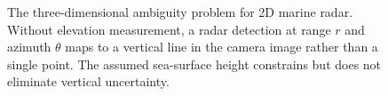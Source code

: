 \begin{figure}[t]
\caption{The three-dimensional ambiguity problem for 2D marine radar. Without elevation measurement, a radar detection at range $r$ and azimuth $\theta$ maps to a vertical line in the camera image rather than a single point. The assumed sea-surface height constrains but does not eliminate vertical uncertainty.}
\label{fig:3d_ambiguity}
\end{figure}
